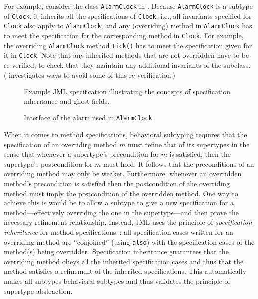 \documentclass{llncs}
\begin{document}
For example, consider the class \texttt{AlarmClock} in .
Because \texttt{AlarmClock} is a subtype of \texttt{Clock}, it 
inherits all the specifications of \texttt{Clock}, i.e., 
all invariants specified for \texttt{Clock} also apply to \texttt{AlarmClock},
and any (overriding) method in \texttt{AlarmClock} has to meet the specification
for the corresponding method in \texttt{Clock}.
For example, the overriding \texttt{AlarmClock} method \texttt{tick()}
has to meet the specification given for it in \texttt{Clock}. 
Note that any inherited methods
that are not overridden have to be re-verified, to check
that they maintain any additional invariants of the subclass.
(\cite{Ruby-Leavens00} investigates
ways to avoid some of this re-verification.)

\begin{figure}[tbp] 
%
%
\vspace*{-2ex} %
\caption{Example JML specification illustrating the concepts of 
specification inheritance and ghost fields.}
\label{Example:alarmclock}
\end{figure}

\begin{figure}[tbp]
%
%
\vspace*{-2ex} %
\caption{Interface of the alarm used in \texttt{AlarmClock}}
\label{Example:alarminterface}
\end{figure}

When it comes to method specifications, behavioral subtyping requires
that the specification of an overriding method $m$ must refine that of its
supertypes in the sense that whenever a supertype's precondition for
$m$ is satisfied, then the supertype's postcondition for $m$ must
hold.  It follows that the preconditions of an overriding method
may only be weaker.
Furthermore, whenever an overridden method's precondition is
satisfied then the postcondition of the overriding method must
imply the postcondition of the overridden method.
%
One way to achieve this is would be to allow a subtype to give a new
specification for a method---effectively overriding the one in the
supertype---and then prove the necessary refinement relationship.
Instead, JML uses the principle of \emph{specification inheritance} 
for method specifications~\cite{Dhara-Leavens96}: all specification cases
written for an overriding method are ``conjoined''  (using
\texttt{also}) with the specification cases of the method(s) being overridden.
Specification inheritance guarantees that the overriding method obeys all the inherited
specification cases and thus that the method satisfies a
refinement of the inherited specifications.  This automatically makes
all subtypes behavioral subtypes and thus validates the principle of
supertype abstraction.
\end{document}
